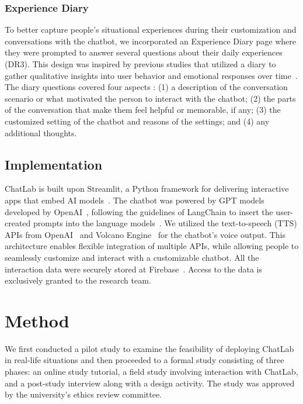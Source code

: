 \subsubsection{Experience Diary}
To better capture people's situational experiences during their customization and conversations with the chatbot, we incorporated an Experience Diary page where they were prompted to answer several questions about their daily experiences (DR3). This design was inspired by previous studies that utilized a diary to gather qualitative insights into user behavior and emotional responses over time~\cite{luo2020tandemtrack, luo2021foodscrap, blair2018onenote}.
The diary questions covered four aspects : (1) a description of the conversation scenario or what motivated the person to interact with the chatbot; (2) the parts of the conversation that make them feel helpful or memorable, if any; (3) the customized setting of the chatbot and reasons of the settings; and (4) any additional thoughts. 





\subsection{Implementation}

ChatLab is built upon Streamlit, a Python framework for delivering interactive apps that embed AI models~\cite{streamlit}. The chatbot was powered by GPT models developed by OpenAI~\cite{openai}, following the guidelines of LangChain to insert the user-created prompts into the language models~\cite{langchain}.
We utilized the text-to-speech (TTS) APIs from OpenAI~\cite{openai} and Volcano Engine~\cite{tiktok} for the chatbot's voice output.
This architecture enables flexible integration of multiple APIs, while allowing people to seamlessly customize and interact with a customizable chatbot.
All the interaction data were securely stored at Firebase~\cite{firebase}. Access to the data is exclusively granted to the research team.

\section{Method}
We first conducted a pilot study to examine the feasibility of deploying ChatLab in real-life situations and then proceeded to a formal study consisting of three phases: an online study tutorial, a field study involving interaction with ChatLab, and a post-study interview along with a design activity. The study was approved by the university's ethics review committee.

